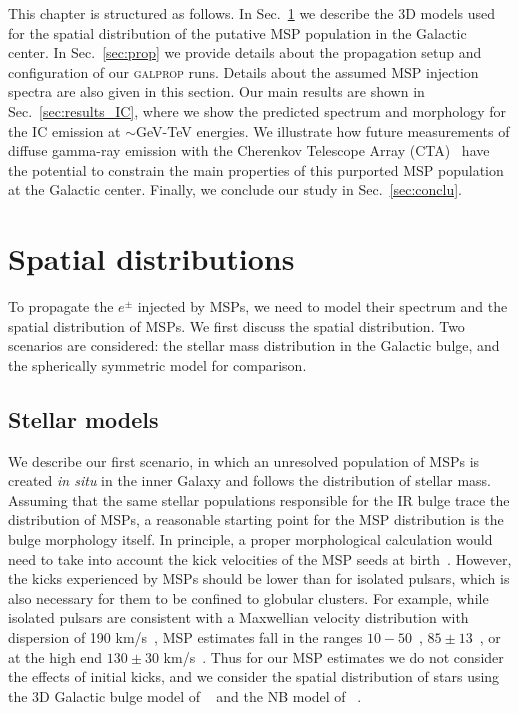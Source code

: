 \documentclass[doublespace,nopageskip]{VTthesis} %
\begin{document}
This chapter is structured as follows. In Sec.~\ref{sec:spatial} we describe the 3D models used for the spatial distribution of the putative MSP population in the Galactic center. In Sec.~\ref{sec:prop} we provide details about the propagation setup and configuration of our \textsc{galprop} runs. Details about the assumed MSP injection spectra are also given in this section. Our main results are shown in Sec.~\ref{sec:results_IC}, where we show the predicted spectrum and morphology for the IC emission at $\sim$GeV-TeV energies. We illustrate how future measurements of diffuse gamma-ray emission with the Cherenkov Telescope Array (CTA)~\cite{2009arXiv0912.3742W,2011ExA....32..193A} have the potential to constrain the main properties of this purported MSP population at the Galactic center. Finally, we conclude our study in Sec.~\ref{sec:conclu}.

\section{Spatial distributions}\label{sec:spatial}

To propagate the $e^\pm$ injected by MSPs, we need to model their spectrum and the spatial distribution of MSPs. We first discuss the spatial distribution. Two scenarios are considered: the stellar mass distribution in the Galactic bulge, and the spherically symmetric model for comparison.

\subsection{Stellar models}\label{sec:stellar}

We describe our first scenario, in which an unresolved population of MSPs is created \emph{in situ} in the inner Galaxy and follows the distribution of stellar mass. Assuming that the same stellar populations responsible for the IR bulge trace the distribution of MSPs, a reasonable starting point for the MSP distribution is the bulge morphology itself. In principle, a proper morphological calculation would need to take into account the kick velocities of the MSP seeds at birth~\cite{2018ApJ...862...79E}. However, the kicks experienced by MSPs should be lower than for isolated pulsars, which is also necessary for them to be confined to globular clusters. For example, while isolated pulsars are consistent with a Maxwellian velocity distribution with dispersion of 190 km/s~\cite{1997MNRAS.291..569H}, MSP estimates fall in the ranges $10-50$~\cite{2013PhRvD..88h3009H,1997ApJ...482..971C}, $85\pm13$~\cite{2004IAUS..218..139H}, or at the high end $130\pm30$ km/s~\cite{1998MNRAS.295..743L}. Thus for our MSP estimates we do not consider the effects of initial kicks, and we consider the spatial distribution of stars using the 3D Galactic bulge model of ~\citet{1998ApJ...492..495F} and the NB model of ~\citet{2002A&A...384..112L}.
\end{document}
